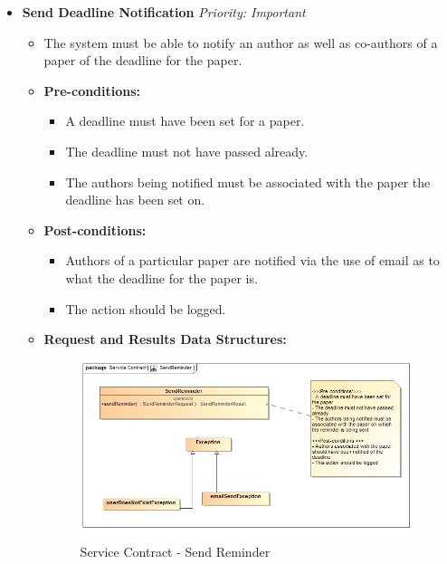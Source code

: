 \documentclass{article}
\begin{document}
				\begin{itemize}
					\item \textbf{Send Deadline Notification} \hfill \textit{Priority: Important}
					\begin{itemize}
						\item The system must be able to notify an author as well as co-authors of a paper of the deadline for the paper.
						\item \textbf{Pre-conditions:}
						\begin{itemize}
							\item A deadline must have been set for a paper.
							\item The deadline must not have passed already.
							\item The authors being notified must be associated with the paper the deadline has been set on.
						\end{itemize}
						\item \textbf{Post-conditions:}
						\begin{itemize}
							\item Authors of a particular paper are notified via the use of email as to what the deadline for the paper is.
							\item The action should be logged.
						\end{itemize}
						\item \textbf{Request and Results Data Structures:}
						\begin{figure}[H]
							\includegraphics[width=\linewidth]{../Diagrams/SendReminder.jpg}
							\caption{Service Contract - Send Reminder}
						\end{figure}
					\end{itemize}
					

\end{itemize}
\end{document}
